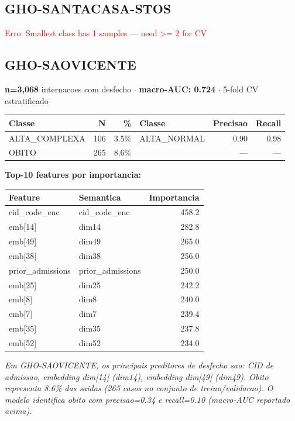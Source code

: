 \documentclass[11pt,a4paper]{article}
\begin{document}
\subsection{GHO-SANTACASA-STOS}
\textcolor{red}{Erro: Smallest class has 1 samples — need >= 2 for CV}

\subsection{GHO-SAOVICENTE}
\textbf{n=3,068} internacoes com desfecho $\cdot$ \textbf{macro-AUC: 0.724} $\cdot$ 5-fold CV estratificado

\begin{tabular}{lrr|lrr}
\toprule
Classe & N & \% & Classe & Precisao & Recall \\
\midrule
ALTA\_COMPLEXA & 106 & 3.5\% & ALTA\_NORMAL & 0.90 & 0.98 \\
OBITO & 265 & 8.6\% &  & --- & --- \\
\bottomrule
\end{tabular}

\vspace{4pt}\noindent\textbf{Top-10 features por importancia:}

\begin{tabular}{llr}
\toprule
Feature & Semantica & Importancia \\
\midrule
cid\_code\_enc & cid\_code\_enc & 458.2 \\
emb[14] & dim14 & 282.8 \\
emb[49] & dim49 & 265.0 \\
emb[38] & dim38 & 256.0 \\
prior\_admissions & prior\_admissions & 250.0 \\
emb[25] & dim25 & 242.2 \\
emb[8] & dim8 & 240.0 \\
emb[7] & dim7 & 239.4 \\
emb[35] & dim35 & 237.8 \\
emb[52] & dim52 & 234.0 \\
\bottomrule
\end{tabular}

\vspace{4pt}\noindent\textit{Em GHO-SAOVICENTE, os principais preditores de desfecho sao: CID de admissao, embedding dim[14] (dim14), embedding dim[49] (dim49). Obito representa 8.6\% das saidas (265 casos no conjunto de treino/validacao). O modelo identifica obito com precisao=0.34 e recall=0.10 (macro-AUC reportado acima).}
\end{document}
